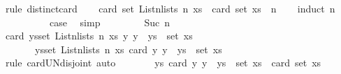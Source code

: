 \begin{isabellebody}
\ {\isacharparenleft}{\kern0pt}rule\ distinct{\isacharunderscore}{\kern0pt}card{\isacharparenright}{\kern0pt}\isanewline
\ \ \isamarkupfalse%
\ {\isachardoublequoteopen}card\ {\isacharparenleft}{\kern0pt}set\ {\isacharparenleft}{\kern0pt}List{\isachardot}{\kern0pt}n{\isacharunderscore}{\kern0pt}lists\ n\ xs{\isacharparenright}{\kern0pt}{\isacharparenright}{\kern0pt}\ {\isacharequal}{\kern0pt}\ card\ {\isacharparenleft}{\kern0pt}set\ xs{\isacharparenright}{\kern0pt}\ {\isacharcircum}{\kern0pt}\ n{\isachardoublequoteclose}\isanewline
\ \ \isamarkupfalse%
\ {\isacharparenleft}{\kern0pt}induct\ n{\isacharparenright}{\kern0pt}\isanewline
\ \ \ \ \isamarkupfalse%
\ {}\ \isamarkupfalse%
\ \isamarkupfalse%
\ {\isacharquery}{\kern0pt}case\ \isamarkupfalse%
\ simp\isanewline
\ \ \isamarkupfalse%
\isanewline
\ \ \ \ \isamarkupfalse%
\ {\isacharparenleft}{\kern0pt}Suc\ n{\isacharparenright}{\kern0pt}\isanewline
\ \ \ \ \isamarkupfalse%
\ \isamarkupfalse%
\ {\isachardoublequoteopen}card\ {\isacharparenleft}{\kern0pt}{\isasymUnion}ys{\isasymin}set\ {\isacharparenleft}{\kern0pt}List{\isachardot}{\kern0pt}n{\isacharunderscore}{\kern0pt}lists\ n\ xs{\isacharparenright}{\kern0pt}{\isachardot}{\kern0pt}\ {\isacharparenleft}{\kern0pt}{\isasymlambda}y{\isachardot}{\kern0pt}\ y\ {\isacharhash}{\kern0pt}\ ys{\isacharparenright}{\kern0pt}\ {\isacharbackquote}{\kern0pt}\ set\ xs{\isacharparenright}{\kern0pt}\isanewline
\ \ \ \ \ \ {\isacharequal}{\kern0pt}\ {\isacharparenleft}{\kern0pt}{\isasymSum}ys{\isasymin}set\ {\isacharparenleft}{\kern0pt}List{\isachardot}{\kern0pt}n{\isacharunderscore}{\kern0pt}lists\ n\ xs{\isacharparenright}{\kern0pt}{\isachardot}{\kern0pt}\ card\ {\isacharparenleft}{\kern0pt}{\isacharparenleft}{\kern0pt}{\isasymlambda}y{\isachardot}{\kern0pt}\ y\ {\isacharhash}{\kern0pt}\ ys{\isacharparenright}{\kern0pt}\ {\isacharbackquote}{\kern0pt}\ set\ xs{\isacharparenright}{\kern0pt}{\isacharparenright}{\kern0pt}{\isachardoublequoteclose}\isanewline
\ \ \ \ \ \ \isamarkupfalse%
\ {\isacharparenleft}{\kern0pt}rule\ card{\isacharunderscore}{\kern0pt}UN{\isacharunderscore}{\kern0pt}disjoint{\isacharparenright}{\kern0pt}\ auto\isanewline
\ \ \ \ \isamarkupfalse%
\ \isamarkupfalse%
\ {\isachardoublequoteopen}{\isasymAnd}ys{\isachardot}{\kern0pt}\ card\ {\isacharparenleft}{\kern0pt}{\isacharparenleft}{\kern0pt}{\isasymlambda}y{\isachardot}{\kern0pt}\ y\ {\isacharhash}{\kern0pt}\ ys{\isacharparenright}{\kern0pt}\ {\isacharbackquote}{\kern0pt}\ set\ xs{\isacharparenright}{\kern0pt}\ {\isacharequal}{\kern0pt}\ card\ {\isacharparenleft}{\kern0pt}set\ xs{\isacharparenright}{\kern0pt}{\isachardoublequoteclose}\isanewline

\end{isabellebody}
